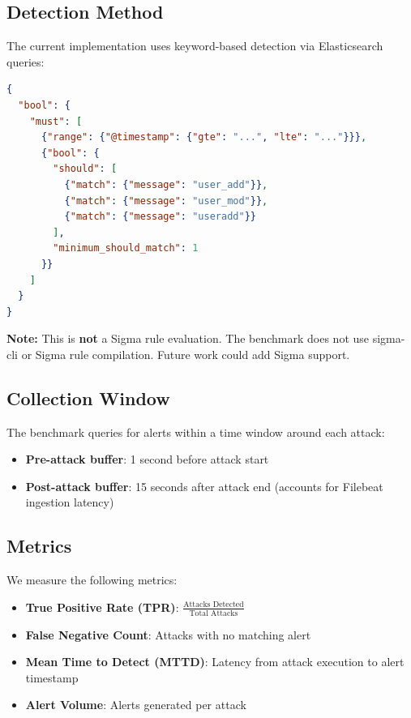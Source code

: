 \documentclass[11pt,a4paper]{article}
\begin{document}
\subsection{Detection Method}

The current implementation uses keyword-based detection via Elasticsearch queries:

\begin{lstlisting}[language=json,caption={Detection Query for T1136.001}]
{
  "bool": {
    "must": [
      {"range": {"@timestamp": {"gte": "...", "lte": "..."}}},
      {"bool": {
        "should": [
          {"match": {"message": "user_add"}},
          {"match": {"message": "user_mod"}},
          {"match": {"message": "useradd"}}
        ],
        "minimum_should_match": 1
      }}
    ]
  }
}
\end{lstlisting}

\textbf{Note:} This is \textbf{not} a Sigma rule evaluation. The benchmark does not use sigma-cli or Sigma rule compilation. Future work could add Sigma support.

\subsection{Collection Window}

The benchmark queries for alerts within a time window around each attack:
\begin{itemize}
    \item \textbf{Pre-attack buffer}: 1 second before attack start
    \item \textbf{Post-attack buffer}: 15 seconds after attack end (accounts for Filebeat ingestion latency)
\end{itemize}

\subsection{Metrics}

We measure the following metrics:

\begin{itemize}
    \item \textbf{True Positive Rate (TPR)}: $\frac{\text{Attacks Detected}}{\text{Total Attacks}}$
    \item \textbf{False Negative Count}: Attacks with no matching alert
    \item \textbf{Mean Time to Detect (MTTD)}: Latency from attack execution to alert timestamp
    \item \textbf{Alert Volume}: Alerts generated per attack
\end{itemize}
\end{document}
